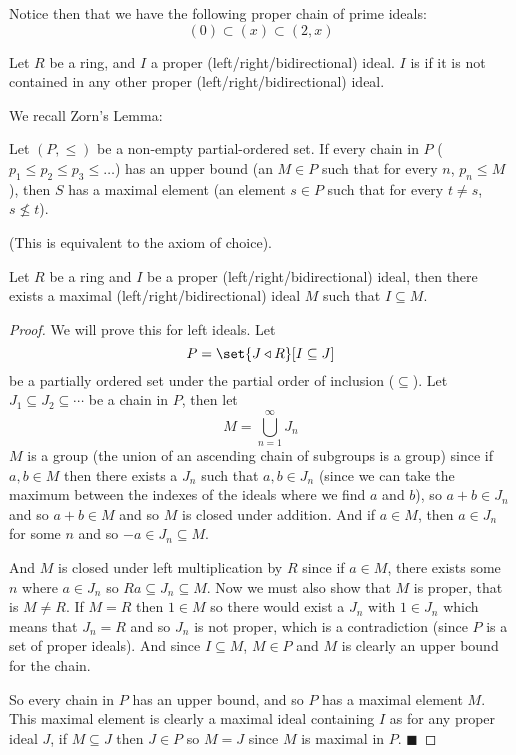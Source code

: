 \documentclass[10pt]{article}
\let\pideal=\triangleleft
\def\qed{\hskip1cm\hbox{}\hfill$\blacksquare$}
\begin{document}
Notice then that we have the following proper chain of prime ideals:
\[ (0) \subset (x) \subset (2,x) \]

\begin{defn*}

    Let $R$ be a ring, and $I$ a proper (left/right/bidirectional) ideal.
    $I$ is  if it is not contained in any other proper (left/right/bidirectional) ideal.

\end{defn*}

We recall Zorn's Lemma:

\begin{lemm*}

    Let $(P,\leq)$ be a non-empty partial-ordered set.
    If every chain in $P$ ($p_1\leq p_2\leq p_3\leq\dots$) has an upper bound (an $M\in P$ such that for every $n$, $p_n\leq M$), then $S$ has a maximal element (an element $s\in P$ such that for every
    $t\neq s$, $s\not\leq t$).

\end{lemm*}

(This is equivalent to the axiom of choice).

\begin{prop*}

    Let $R$ be a ring and $I$ be a proper (left/right/bidirectional) ideal, then there exists a maximal (left/right/bidirectional) ideal $M$ such that $I\subseteq M$.

\end{prop*}

\begin{proof}

    We will prove this for left ideals.
    Let
    \[ P = \set{J\pideal R}[I\subseteq J] \]
    be a partially ordered set under the partial order of inclusion ($\subseteq$).
    Let $J_1\subseteq J_2\subseteq\cdots$ be a chain in $P$, then let
    \[ M = \bigcup_{n=1}^\infty J_n \]
    $M$ is a group (the union of an ascending chain of subgroups is a group) since if $a,b\in M$ then there exists a $J_n$ such that $a,b\in J_n$ (since we can take the maximum between the indexes of the
    ideals where we find $a$ and $b$), so $a+b\in J_n$ and so $a+b\in M$ and so $M$ is closed under addition.
    And if $a\in M$, then $a\in J_n$ for some $n$ and so $-a\in J_n\subseteq M$.

    And $M$ is closed under left multiplication by $R$ since if $a\in M$, there exists some $n$ where $a\in J_n$ so $Ra\subseteq J_n\subseteq M$.
    Now we must also show that $M$ is proper, that is $M\neq R$.
    If $M=R$ then $1\in M$ so there would exist a $J_n$ with $1\in J_n$ which means that $J_n=R$ and so $J_n$ is not proper, which is a contradiction (since $P$ is a set of proper ideals).
    And since $I\subseteq M$, $M\in P$ and $M$ is clearly an upper bound for the chain.

    So every chain in $P$ has an upper bound, and so $P$ has a maximal element $M$.
    This maximal element is clearly a maximal ideal containing $I$ as for any proper ideal $J$, if $M\subseteq J$ then $J\in P$ so $M=J$ since $M$ is maximal in $P$.
    \qed

\end{proof}
\end{document}
